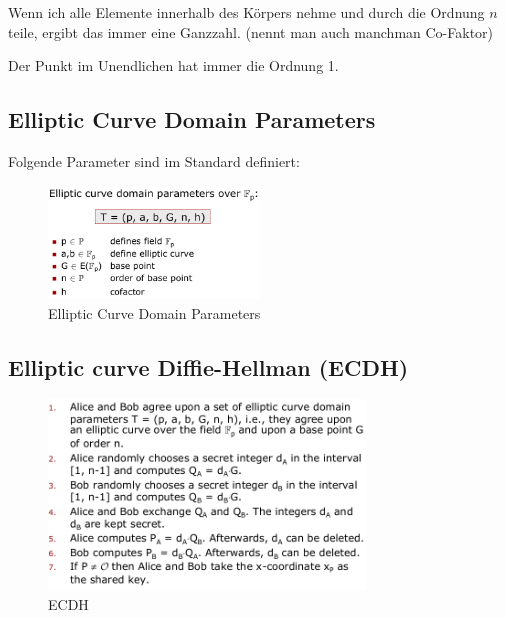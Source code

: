 Wenn ich alle Elemente innerhalb des Körpers nehme und durch die Ordnung
$n$ teile, ergibt das immer eine Ganzzahl. (nennt man auch manchman
Co-Faktor)

\begin{tcolorbox}[colback=red!5!white,colframe=red!75!black]
Der Punkt im Unendlichen hat immer die Ordnung 1.
\end{tcolorbox}

\hypertarget{elliptic-curve-domain-parameters}{%
\subsection{Elliptic Curve Domain
Parameters}\label{elliptic-curve-domain-parameters}}

Folgende Parameter sind im Standard definiert:

\begin{figure}[H]
\centering
\includegraphics[width=0.5\textwidth]{figures/ellipticCurveDomainParameters.png}
\caption{Elliptic Curve Domain Parameters}
\end{figure}

\hypertarget{elliptic-curve-diffie-hellman-ecdh}{%
\subsection{Elliptic curve Diffie-Hellman
(ECDH)}\label{elliptic-curve-diffie-hellman-ecdh}}

\begin{figure}[H]
\centering
\includegraphics[width=0.75\textwidth]{figures/ecdh.png}
\caption{ECDH}
\end{figure}

